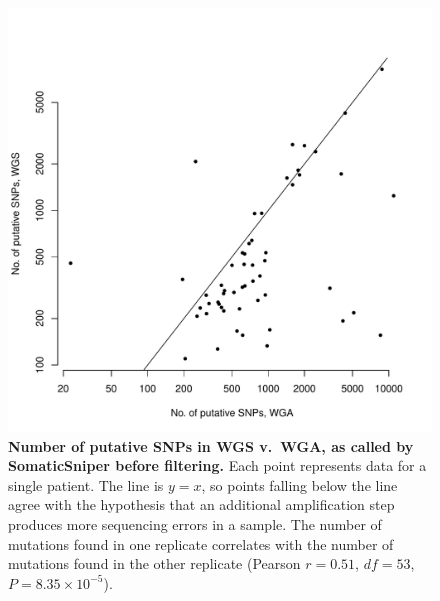 \documentclass[11pt]{article} %
\begin{document}
\begin{figure}
\centerline{
\includegraphics[width=5in]{C282_v_C484.pdf} }
\caption{\textbf{Number of putative SNPs in WGS v.\ WGA, as called by SomaticSniper before filtering.} Each point represents data for a single patient. The line is $y=x$, so points falling below the line agree with the hypothesis that an additional amplification step produces more sequencing errors in a sample. The number of mutations found in one replicate correlates with the number of mutations found in the other replicate (Pearson $r=0.51$, $df = 53$, $P = 8.35\times 10^{-5}$).}
\label{fig:C282_v_C484}
\end{figure}
\end{document}
